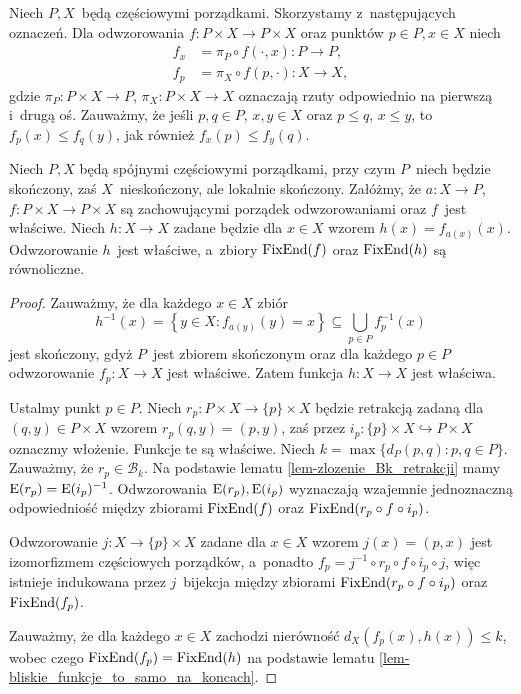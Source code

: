 Niech $P,X$~będą częściowymi porządkami. Skorzystamy z~następujących oznaczeń. Dla odwzorowania $f\colon P\times X\to P\times X$ oraz punktów $p\in P, x\in X$ niech \begin{align*}f_x&=\pi_P\circ f(\cdot,x)\colon P\to P,\\f_p&=\pi_X\circ f(p,\cdot)\colon X\to X,\end{align*} gdzie $\pi_P\colon P\times X\to P$, $\pi_X\colon P\times X\to X$ oznaczają rzuty odpowiednio na pierwszą i~drugą oś. Zauważmy, że jeśli $p,q\in P$, $x,y\in X$ oraz $p\leq q$, $x\leq y$, to $f_p(x)\leq f_q(y)$, jak również $f_x(p)\leq f_y(q)$.


\begin{lem}\label{lem-koniec_na_produkcie_koncem_wspolrzednej}
Niech $P,X$ będą spójnymi częściowymi porządkami, przy czym $P$~niech będzie skończony, zaś $X$~nieskończony, ale lokalnie skończony. Załóżmy, że $a\colon X\to P$, $f\colon P\times X\to P\times X$ są zachowującymi porządek odwzorowaniami oraz $f$~jest właściwe. Niech $h\colon X\to X$ zadane będzie dla $x\in X$ wzorem $h(x)=f_{a(x)}(x)$. Odwzorowanie $h$~jest właściwe, a~zbiory $\operatorname{FixEnd}(f)$ oraz $\operatorname{FixEnd}(h)$ są równoliczne.
\end{lem}
\begin{proof}
Zauważmy, że dla każdego $x\in X$ zbiór \[h^{-1}(x)=\left\{y\in X:f_{a(y)}(y)=x\right\}\subseteq \bigcup_{p\in P}f_p^{-1}(x)\] jest skończony, gdyż $P$~jest zbiorem skończonym oraz dla każdego $p\in P$ odwzorowanie $f_p\colon X\to X$ jest właściwe. Zatem funkcja $h\colon X\to X$ jest właściwa.

Ustalmy punkt $p\in P$. Niech $r_p\colon P\times X\to \{p\}\times X$ będzie retrakcją zadaną dla $(q,y)\in P\times X$ wzorem $r_p(q,y)=(p,y)$, zaś przez $i_p\colon \{p\}\times X\hookrightarrow P\times X$ oznaczmy włożenie. Funkcje te są właściwe. Niech $k=\max\{d_P(p,q):p,q\in P\}$. Zauważmy, że $r_p\in \mathcal{B}_k$. Na podstawie lematu \ref{lem-zlozenie_Bk_retrakcji} mamy $\mathrm{E}(r_p)=\mathrm{E}(i_p)^{-1}$. Odwzorowania $\mathrm{E}(r_p), \mathrm{E}(i_p)$ wyznaczają wzajemnie jednoznaczną odpowiedniość między zbiorami $\operatorname{FixEnd}(f)$ oraz $\operatorname{FixEnd}(r_p\circ f\circ i_p)$.

Odwzorowanie $j\colon X\to \{p\}\times X$ zadane dla $x\in X$ wzorem $j(x)=(p,x)$ jest izomorfizmem częściowych porządków, a~ponadto $f_p=j^{-1}\circ r_p \circ f \circ i_p \circ j$, więc istnieje indukowana przez $j$~bijekcja między zbiorami $\operatorname{FixEnd}(r_p\circ f\circ i_p)$ oraz $\operatorname{FixEnd}(f_p)$.


Zauważmy, że dla każdego $x\in X$ zachodzi nierówność $d_X(f_p(x),h(x))\leq k$, wobec czego $\operatorname{FixEnd}(f_p)=\operatorname{FixEnd}(h)$ na podstawie lematu \ref{lem-bliskie_funkcje_to_samo_na_koncach}.
\end{proof}



